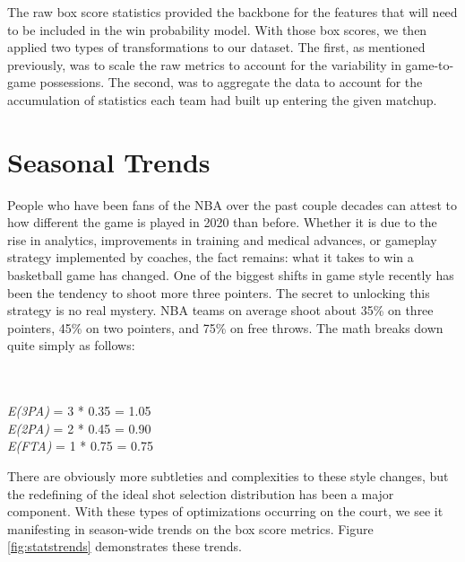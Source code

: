\documentclass [MS] {uclathes}
\begin{document}
The raw box score statistics provided the backbone for the features that will need to be included in the win probability model. With those box scores, we then applied two types of transformations to our dataset. The first, as mentioned previously, was to scale the raw metrics to account for the variability in game-to-game possessions. The second, was to aggregate the data to account for the accumulation of statistics each team had built up entering the given matchup. 

\section{Seasonal Trends}

People who have been fans of the NBA over the past couple decades can attest to how different the game is played in 2020 than before. Whether it is due to the rise in analytics, improvements in training and medical advances, or gameplay strategy implemented by coaches, the fact remains: what it takes to win a basketball game has changed. One of the biggest shifts in game style recently has been the tendency to shoot more three pointers. The secret to unlocking this strategy is no real mystery. NBA teams on average shoot about 35\% on three pointers, 45\% on two pointers, and 75\% on free throws. The math breaks down quite simply as follows: 

\noindent {} \\
\noindent {} \\
\noindent \emph{E(3PA)} = 3 * 0.35 = 1.05 \\
\noindent \emph{E(2PA)} = 2 * 0.45 = 0.90 \\
\noindent \emph{E(FTA)} = 1 * 0.75 = 0.75

There are obviously more subtleties and complexities to these style changes, but the redefining of the ideal shot selection distribution has been a major component. With these types of optimizations occurring on the court, we see it manifesting in season-wide trends on the box score metrics. Figure \ref{fig:statstrends} demonstrates these trends. 
\end{document}
